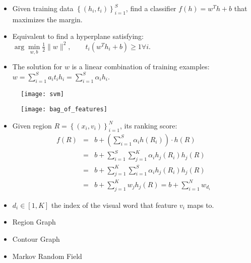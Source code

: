 \documentclass[11pt, a4paper, landscape]{article}
\begin{document}
\NewPage{}
\vfill
\begin{itemize}
\item Given training data $\left\lbrace (h_i, t_i) \right\rbrace _{i = 1} ^S$, find a classifier $f(h) = w^Th + b$ that maximizes the margin.
\item Equivalent to find a hyperplane satisfying: $\arg\min\limits_{w, b} \frac{1}{2} \|w\| ^2, \qquad t_i(w^Th_i + b) \geq 1 \forall i$.
\item The solution for $w$ is a linear combination of training examples: $w = \sum\limits_{i = 1}^{S} a_it_ih_i = \sum\limits_{i = 1}^{S} \alpha_ih_i$.
\end{itemize}
\begin{figure}
	\centering
	\texttt{[image: svm]}
\end{figure}
\vfill


\NewPage{}
\vfill
\begin{figure}
	\centering
	\texttt{[image: bag\_of\_features]}
\end{figure}
\begin{itemize}
\item Given region $R = \left\lbrace (x_i, v_i) \right\rbrace _{i = 1} ^N$, its ranking score:
\begin{equation*}
\begin{array}{lcl}
f(R) & = & b + (\sum\limits_{i = 1}^{S}\alpha_ih(R_i)) \cdot h(R)\\
     & = & b + \sum\limits_{i = 1}^{S}\sum\limits_{j = 1}^{K} \alpha_ih_j(R_i)h_j(R)\\
     & = & b + \sum\limits_{j = 1}^{K}\sum\limits_{i = 1}^{S} \alpha_ih_j(R_i)h_j(R)\\
     & = & b + \sum\limits_{j = 1}^{K} w_jh_j(R) = b + \sum\limits_{i = 1}^{N} w_{d_i}
\end{array}
\end{equation*}
\item $d_i \in \left[ 1, K \right] $ the index of the visual word that feature $v_i$ maps to.
\end{itemize}
\vfill


\NewPage{}
\vfill
\begin{itemize}
\item Region Graph
\item Contour Graph
\item Markov Random Field
\end{itemize}
\vfill
\end{document}
